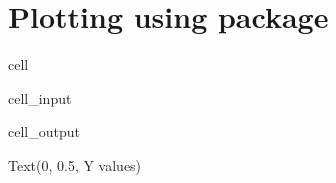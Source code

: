\documentclass[letterpaper,10pt,english]{jupyterBook}
\begin{document}
\section{Plotting using  package}
\label{\detokenize{notebooks/getting_started/basic_math:plotting-using-matplotlib-package}}
\begin{sphinxuseclass}{cell}\begin{sphinxVerbatimInput}

\begin{sphinxuseclass}{cell_input}
\begin{sphinxVerbatim}[commandchars=\\\{\}]
\PYG{p}{[}\PYG{p}{]}\PYG{p}{[}\PYG{p}{]} 
\end{sphinxVerbatim}

\end{sphinxuseclass}\end{sphinxVerbatimInput}
\begin{sphinxVerbatimOutput}

\begin{sphinxuseclass}{cell_output}
\begin{sphinxVerbatim}[commandchars=\\\{\}]
Text(0, 0.5, \PYGZsq{}Y values\PYGZsq{})
\end{sphinxVerbatim}

\noindent{}

\end{sphinxuseclass}\end{sphinxVerbatimOutput}

\end{sphinxuseclass}
\end{document}

